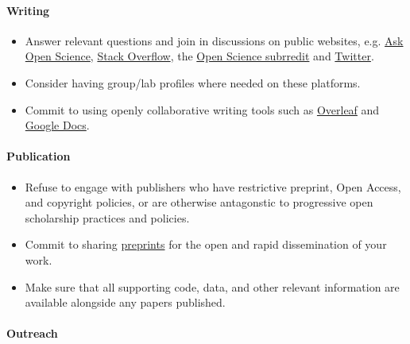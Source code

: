\paragraph{Writing}\label{writing-1}

\begin{itemize}
\item
  Answer relevant questions and join in discussions on public websites,
  e.g. \href{https://ask-open-science.org/}{Ask Open Science},
  \href{https://stackoverflow.com/}{Stack Overflow}, the
  \href{https://www.reddit.com/r/Open_Science/}{Open Science subrredit}
  and \href{https://twitter.com}{Twitter}.
\item
  Consider having group/lab profiles where needed on these platforms.
\item
  Commit to using openly collaborative writing tools such as
  \href{https://www.overleaf.com/}{Overleaf} and
  \href{https://docs.google.com/document/u/0/}{Google Docs}.
\end{itemize}

\paragraph{Publication}\label{publication-1}

\begin{itemize}
\item
  Refuse to engage with publishers who have restrictive preprint, Open
  Access, and copyright policies, or are otherwise antagonstic to
  progressive open scholarship practices and policies.
\item
  Commit to sharing \href{http://asapbio.org/preprint-info}{preprints}
  for the open and rapid dissemination of your work.
\item
  Make sure that all supporting code, data, and other relevant
  information are available alongside any papers published.
\end{itemize}

\paragraph{Outreach}\label{outreach-1}

